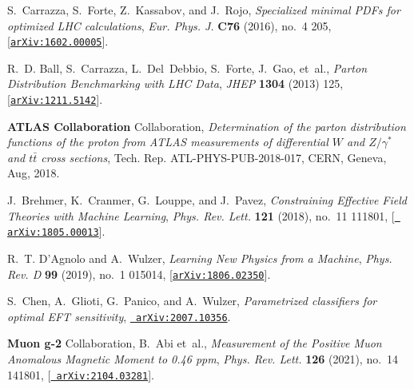 \documentclass[11pt,a4paper]{article}
\numberwithin{equation}{section}
\numberwithin{figure}{section}
\numberwithin{table}{section}
\begin{document}
\begin{thebibliography}{100}
S.~Carrazza, S.~Forte, Z.~Kassabov, and J.~Rojo, {\it {Specialized minimal PDFs
  for optimized LHC calculations}},  {\em Eur. Phys. J.} {\bf C76} (2016),
  no.~4 205, [\href{http://arxiv.org/abs/1602.00005}{{\tt arXiv:1602.00005}}].

R.~D. Ball, S.~Carrazza, L.~Del~Debbio, S.~Forte, J.~Gao, et~al., {\it {Parton
  Distribution Benchmarking with LHC Data}},  {\em JHEP} {\bf 1304} (2013) 125,
  [\href{http://arxiv.org/abs/1211.5142}{{\tt arXiv:1211.5142}}].

{\bf ATLAS Collaboration} Collaboration, {\it {Determination of the parton
  distribution functions of the proton from ATLAS measurements of differential
  $W$ and $Z/\gamma^*$ and $t\bar{t}$ cross sections}},  Tech. Rep.
  ATL-PHYS-PUB-2018-017, CERN, Geneva, Aug, 2018.

J.~Brehmer, K.~Cranmer, G.~Louppe, and J.~Pavez, {\it {Constraining Effective
  Field Theories with Machine Learning}},  {\em Phys. Rev. Lett.} {\bf 121}
  (2018), no.~11 111801, [\href{http://arxiv.org/abs/1805.00013}{{\tt
  arXiv:1805.00013}}].

R.~T. D'Agnolo and A.~Wulzer, {\it {Learning New Physics from a Machine}},
  {\em Phys. Rev. D} {\bf 99} (2019), no.~1 015014,
  [\href{http://arxiv.org/abs/1806.02350}{{\tt arXiv:1806.02350}}].

S.~Chen, A.~Glioti, G.~Panico, and A.~Wulzer, {\it {Parametrized classifiers
  for optimal EFT sensitivity}},  \href{http://arxiv.org/abs/2007.10356}{{\tt
  arXiv:2007.10356}}.

{\bf Muon g-2} Collaboration, B.~Abi et~al., {\it {Measurement of the Positive
  Muon Anomalous Magnetic Moment to 0.46 ppm}},  {\em Phys. Rev. Lett.} {\bf
  126} (2021), no.~14 141801, [\href{http://arxiv.org/abs/2104.03281}{{\tt
  arXiv:2104.03281}}].

\end{thebibliography}\endgroup
\end{document}
